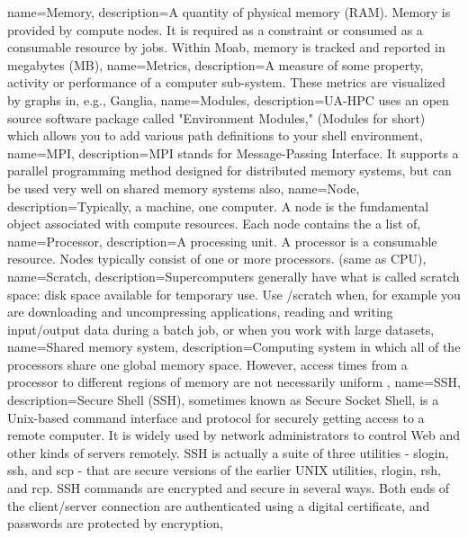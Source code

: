 {
  name={Memory},
  description={A quantity of physical memory (RAM). Memory is provided by compute nodes. It is required as a constraint or consumed as a consumable resource by jobs. Within Moab, memory is tracked and reported in megabytes (MB)},
}
{
  name={Metrics},
  description={A measure of some property, activity or performance of a computer sub-system. These metrics are visualized by graphs in, e.g., Ganglia},
}
{
  name={Modules},
  description={UA-HPC uses an open source software package called "Environment Modules," (Modules for short) which allows you to add various path definitions to your shell environment},
}
{
  name={MPI},
  description={MPI stands for Message-Passing Interface. It supports a parallel programming method designed for distributed memory systems, but can be used very well on shared memory systems also},
}
{
  name={Node},
  description={Typically, a machine, one computer. A node is the fundamental object associated with compute resources. Each node contains the a list of},
}
{
  name={Processor},
  description={A processing unit. A processor is a consumable resource. Nodes typically consist of one or more processors. (same as CPU)},
}
{
  name={Scratch},
  description={Supercomputers generally have what is called scratch space: disk space available for temporary use. Use /scratch when, for example you are downloading and uncompressing applications, reading and writing input/output data during a batch job, or when you work with large datasets},
}
{
  name={Shared memory system},
  description={Computing system in which all of the processors share one global memory space. However, access times from a processor to different regions of memory are not necessarily uniform },
}
{
  name={SSH},
  description={Secure Shell (SSH), sometimes known as Secure Socket Shell, is a Unix-based command interface and protocol for securely getting access to a remote computer. It is widely used by network administrators to control Web and other kinds of servers remotely. SSH is actually a suite of three utilities - slogin, ssh, and scp - that are secure versions of the earlier UNIX utilities, rlogin, rsh, and rcp. SSH commands are encrypted and secure in several ways. Both ends of the client/server connection are authenticated using a digital certificate, and passwords are protected by encryption},
}
